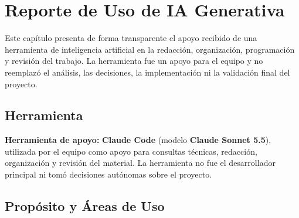 \chapter{Reporte de Uso de IA Generativa}
\label{ch:ia}

Este capítulo presenta de forma transparente el apoyo recibido de una herramienta de
inteligencia artificial en la redacción, organización, programación y revisión del trabajo.
La herramienta fue un apoyo para el equipo y no reemplazó el análisis, las decisiones,
la implementación ni la validación final del proyecto.

\section{Herramienta}
\label{sec:herramienta-ia}

\textbf{Herramienta de apoyo:} \textbf{Claude Code} (modelo \textbf{Claude Sonnet 5.5}),
utilizada por el equipo como apoyo para consultas técnicas, redacción, organización y
revisión del material. La herramienta no fue el desarrollador principal ni tomó decisiones
autónomas sobre el proyecto.

\section{Propósito y Áreas de Uso}
\label{sec:proposito-ia}

